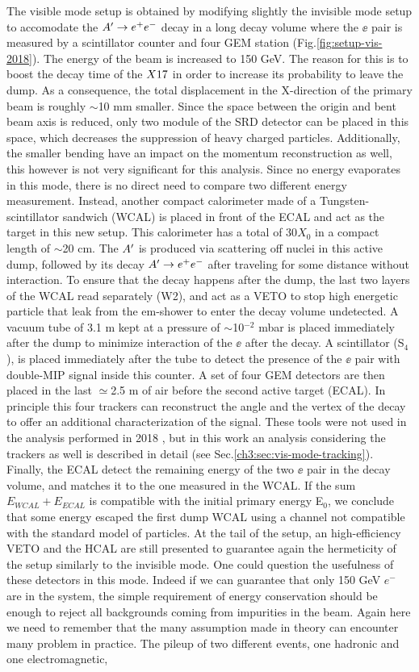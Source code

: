 The visible mode setup is obtained by modifying slightly the invisible mode setup to accomodate the $A' \to e^+e^-$ decay in a long decay volume where the $\ee$ pair is measured by a scintillator counter and four GEM station (Fig.\ref{fig:setup-vis-2018}). The energy of the beam is increased to 150 GeV. The reason for this is to boost the decay time of the $X17$ in order to increase its probability to leave the dump. As a consequence, the total displacement in the X-direction of the primary beam is roughly $\sim$10 \si{mm} smaller. Since the space between the origin and bent beam axis is reduced, only two module of the SRD detector can be placed in this space, which decreases the suppression of heavy charged particles. Additionally, the smaller bending have an impact on the momentum reconstruction as well, this however is not very significant for this analysis. Since no energy evaporates in this mode, there is no direct need to compare two different energy measurement. Instead, another compact calorimeter made of a Tungsten-scintillator sandwich (WCAL) is placed in front of the ECAL and act as the target in this new setup. This calorimeter has a total of 30$X_0$ in a compact length of $\sim$20 \si{cm}. The $A'$ is produced via scattering off nuclei in this active dump, followed by its decay $A' \to e^+e^-$ after traveling for some distance without interaction. To ensure that the decay happens after the dump, the last two layers of the WCAL read separately (W2), and act as a VETO to stop high energetic particle that leak from the em-shower to enter the decay volume undetected. A vacuum tube of 3.1 \si{m} kept at a pressure of $\sim$10$^{-2}$ \si{mbar} is placed immediately after the dump to minimize interaction of the $\ee$ after the decay. A scintillator (S$_4$), is placed immediately after the tube to detect the presence of the $\ee$ pair with double-MIP signal inside this counter. A set of four GEM detectors are then placed in the last $\simeq$2.5 \si{m} of air before the second active target (ECAL). In principle this four trackers can reconstruct the angle and the vertex of the decay to offer an additional characterization of the signal. These tools were not used in the analysis performed in 2018 \cite{Banerjee:2019hmi}, but in this work an analysis considering the trackers as well is described in detail (see Sec.\ref{ch3:sec:vis-mode-tracking}). Finally, the ECAL detect the remaining energy of the two $\ee$ pair in the decay volume, and matches it to the one measured in the WCAL. If the sum $E_{WCAL}+E_{ECAL}$ is compatible with the initial primary energy E$_0$, we conclude that some energy escaped the first dump WCAL using a channel not compatible with the standard model of particles. At the tail of the setup, an high-efficiency VETO and the HCAL are still presented to guarantee again the hermeticity of the setup similarly to the invisible mode. One could question the usefulness of these detectors in this mode. Indeed if we can guarantee that only 150 GeV $e^-$ are in the system, the simple requirement of energy conservation should be enough to reject all backgrounds coming from impurities in the beam. Again here we need to remember that the many assumption made in theory can encounter many problem in practice. The pileup of two different events, one hadronic and one electromagnetic, 